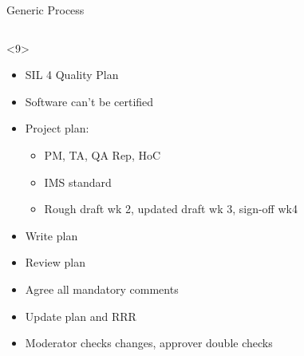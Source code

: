 \documentclass{beamer}
\begin{document}
\begin{frame}[fragile]{Generic Process}
\begin{columns}
\begin{column}{6.0cm}
        \begin{onlyenv}<9>
           \begin{itemize}
              \item SIL 4 Quality Plan
              \item Software can't be certified
              \item Project plan:
              \begin{itemize}
                  \item PM, TA, QA Rep, HoC
                  \item IMS standard
                  \item Rough draft wk 2, updated draft wk 3, sign-off wk4
              \end{itemize}
              \item Write plan
              \item Review plan
              \item Agree all mandatory comments
              \item Update plan and RRR
              \item Moderator checks changes, approver double checks
           \end{itemize}
        \end{onlyenv}
     \end{column}
  \end{columns}
\end{frame}
\end{document}
